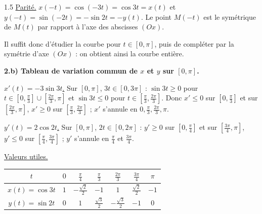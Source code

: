 \documentclass[12pt]{article}
\begin{document}
\begin{spacing}{1.5}
\underline{Parité.} $x(-t)=\cos(-3t)=\cos3t=x(t)$ et $y(-t)=\sin(-2t)=-\sin2t=-y(t)$. Le point $M(-t)$ est le symétrique de $M(t)$ par rapport à l'axe des abscisses $(Ox)$.

Il suffit donc d'étudier la courbe pour $t\in[0,\pi]$, puis de compléter par la symétrie d'axe $(Ox)$ : on obtient ainsi la courbe entière.

\textbf{2.b) Tableau de variation commun de $x$ et $y$ sur $[0,\pi]$.}

\underline{$x'(t)=-3\sin3t$.} Sur $[0,\pi]$, $3t\in[0,3\pi]$ : $\sin3t\ge0$ pour $t\in[0,\frac\pi3]\cup[\frac{2\pi}3,\pi]$ et $\sin3t\le0$ pour $t\in[\frac\pi3,\frac{2\pi}3]$. Donc $x'\le0$ sur $[0,\frac\pi3]$ et sur $[\frac{2\pi}3,\pi]$, $x'\ge0$ sur $[\frac\pi3,\frac{2\pi}3]$ ; $x'$ s'annule en $0,\frac\pi3,\frac{2\pi}3,\pi$.

\underline{$y'(t)=2\cos2t$.} Sur $[0,\pi]$, $2t\in[0,2\pi]$ : $y'\ge0$ sur $[0,\frac\pi4]$ et sur $[\frac{3\pi}4,\pi]$, $y'\le0$ sur $[\frac\pi4,\frac{3\pi}4]$ ; $y'$ s'annule en $\frac\pi4$ et $\frac{3\pi}4$.

\underline{Valeurs utiles.}
\begin{center}
\begin{tabular}{|c|c|c|c|c|c|c|}
\hline
$t$ & $0$ & $\frac\pi4$ & $\frac\pi3$ & $\frac{2\pi}3$ & $\frac{3\pi}4$ & $\pi$\\
\hline
$x(t)=\cos3t$ & $1$ & $-\frac{\sqrt2}2$ & $-1$ & $1$ & $\frac{\sqrt2}2$ & $-1$\\
\hline
$y(t)=\sin2t$ & $0$ & $1$ & $\frac{\sqrt3}2$ & $-\frac{\sqrt3}2$ & $-1$ & $0$\\
\hline
\end{tabular}
\end{center}

\begin{center}
\end{center}


\end{spacing}
\end{document}
